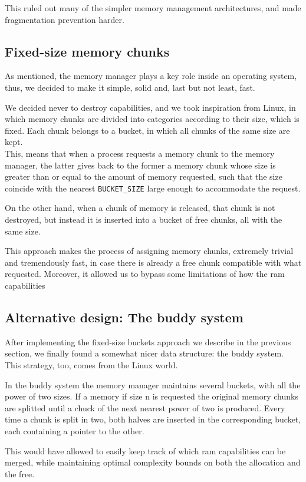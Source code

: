 \documentclass[a4paper,twoside,openright]{report}
\begin{document}
This ruled out many of the simpler memory management architectures, and made fragmentation prevention harder.

\subsection{Fixed-size memory chunks}
As mentioned, the memory manager plays a key role inside an operating system, thus, we decided to make it simple, solid and, last but not least, fast.

We decided never to destroy capabilities, and we took inspiration from Linux\cite{iperf3}, in which memory chunks are divided into categories according to their size, which is fixed.
Each chunk belongs to a bucket, in which all chunks of the same size are kept.\\

This, means that when a process requests a memory chunk to the memory manager, the latter gives back to the former a memory chunk whose size is greater than or equal to the amount of memory requested, such that the size coincide with the nearest \texttt{BUCKET\_SIZE} large enough to accommodate the request.

On the other hand, when a chunk of memory is released, that chunk is not destroyed, but instead it is inserted into a bucket of free chunks, all with the same size.

This approach makes the process of assigning memory chunks, extremely trivial and tremendously fast, in case there is already a free chunk compatible with what requested.
Moreover, it allowed us to bypass some limitations of how the ram capabilities 

\subsection{Alternative design: The buddy system}
After implementing the fixed-size buckets approach we describe in the previous section, we finally found a somewhat nicer data structure: the buddy system. This strategy, too, comes from the Linux world.

In the buddy system the memory manager maintains several buckets, with all the power of two sizes. If a memory if size n is requested the original memory chunks are splitted until a chuck of the next nearest power of two is produced. Every time a chunk is split in two, both halves are inserted in the corresponding bucket, each containing a pointer to the other.

This would have allowed to easily keep track of which ram capabilities can be merged, while maintaining optimal complexity bounds on both the allocation and the free.
\end{document}
